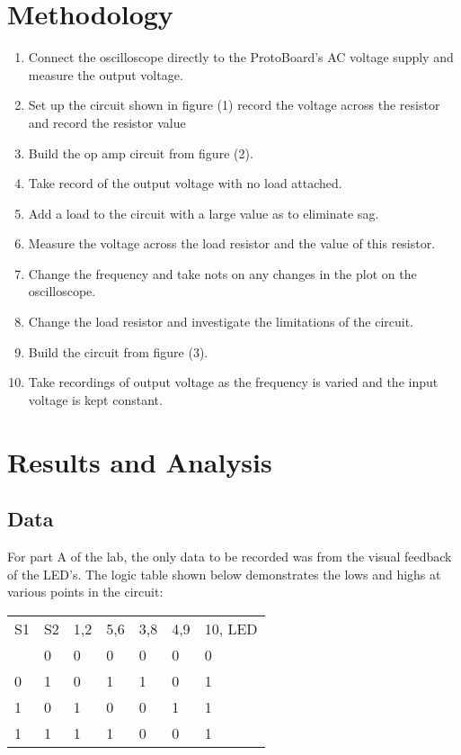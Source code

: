 \documentclass[twocolumn, amsmath]{revtex4}
\begin{document}
\section{Methodology}

\begin{enumerate}
    \item Connect the oscilloscope directly to the ProtoBoard's AC voltage supply and measure the output voltage.
    \item Set up the circuit shown in figure (1) record the voltage across the resistor and record the resistor value
    \item Build the op amp circuit from figure (2).
    \item Take record of the output voltage with no load attached.
    \item Add a load to the circuit with a large value as to eliminate sag.
    \item Measure the voltage across the load resistor and the value of this resistor.
    \item Change the frequency and take nots on any changes in the plot on the oscilloscope.
    \item Change the load resistor and investigate the limitations of the circuit.
    \item Build the circuit from figure (3).
    \item Take recordings of output voltage as the frequency is varied and the input voltage is kept constant.
\end{enumerate}


\section{Results and Analysis}

\subsection{Data}
For part A of the lab, the only data to be recorded was from the visual feedback of the LED's. The logic table shown below demonstrates the lows and highs at various points in the circuit:

\begin{center}
	\begin{ruledtabular}
    \begin{tabular}{ l l l l l l l}
	S1 & S2 & 1,2 & 5,6 & 3,8 & 4,9 & 10, LED \\ \colrule
	0 & 0 & 0 & 0 & 0 & 0 & 0  \\
	0 & 1 & 0 & 1 & 1 & 0 & 1 \\
	1 & 0 & 1 & 0 & 0 & 1 & 1  \\
	1 & 1 & 1 & 1 & 0 & 0 & 1 \\
\end{tabular}
    \end{ruledtabular}
\end{center}
\end{document}
